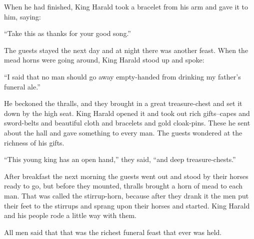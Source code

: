 When he had finished, King Harald took a bracelet from his arm and gave
it to him, saying:

``Take this as thanks for your good song.''

The guests stayed the next day and at night there was another feast.
When the mead horns were going around, King Harald stood up and spoke:

``I said that no man should go away empty-handed from drinking my
father's funeral ale.''

He beckoned the thralls, and they brought in a great treasure-chest and
set it down by the high seat. King Harald opened it and took out rich
gifts--capes and sword-belts and beautiful cloth and bracelets and gold
cloak-pins. These he sent about the hall and gave something to every
man. The guests wondered at the richness of his gifts.

``This young king has an open hand,'' they said, ``and deep
treasure-chests.''

After breakfast the next morning the guests went out and stood by their
horses ready to go, but before they mounted, thralls brought a horn of
mead to each man. That was called the stirrup-horn, because after they
drank it the men put their feet to the stirrups and sprang upon their
horses and started. King Harald and his people rode a little way with
them.

All men said that that was the richest funeral feast that ever was held.
